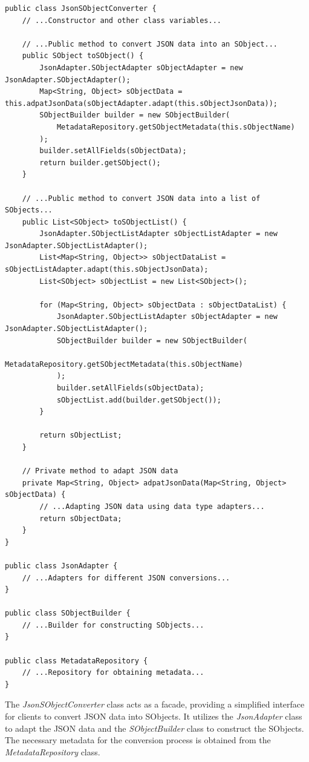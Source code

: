 \documentclass[12pt]{article}
\begin{document}
\begin{lstlisting}
public class JsonSObjectConverter {
    // ...Constructor and other class variables...
    
    // ...Public method to convert JSON data into an SObject...
    public SObject toSObject() {
        JsonAdapter.SObjectAdapter sObjectAdapter = new JsonAdapter.SObjectAdapter();
        Map<String, Object> sObjectData = this.adpatJsonData(sObjectAdapter.adapt(this.sObjectJsonData));
        SObjectBuilder builder = new SObjectBuilder(
            MetadataRepository.getSObjectMetadata(this.sObjectName)
        );
        builder.setAllFields(sObjectData);
        return builder.getSObject();
    }

    // ...Public method to convert JSON data into a list of SObjects...
    public List<SObject> toSObjectList() {
        JsonAdapter.SObjectListAdapter sObjectListAdapter = new JsonAdapter.SObjectListAdapter();
        List<Map<String, Object>> sObjectDataList = sObjectListAdapter.adapt(this.sObjectJsonData);
        List<SObject> sObjectList = new List<SObject>();

        for (Map<String, Object> sObjectData : sObjectDataList) {
            JsonAdapter.SObjectListAdapter sObjectAdapter = new JsonAdapter.SObjectListAdapter();
            SObjectBuilder builder = new SObjectBuilder(
                MetadataRepository.getSObjectMetadata(this.sObjectName)
            );
            builder.setAllFields(sObjectData);
            sObjectList.add(builder.getSObject());
        }

        return sObjectList;
    }

    // Private method to adapt JSON data
    private Map<String, Object> adpatJsonData(Map<String, Object> sObjectData) {
        // ...Adapting JSON data using data type adapters...
        return sObjectData;
    }
}

public class JsonAdapter {
    // ...Adapters for different JSON conversions...
}

public class SObjectBuilder {
    // ...Builder for constructing SObjects...
}

public class MetadataRepository {
    // ...Repository for obtaining metadata...
}    
\end{lstlisting}

The \textit{JsonSObjectConverter} class acts as a facade, providing a simplified interface for clients to convert JSON data into SObjects. It utilizes the \textit{JsonAdapter} class to adapt the JSON data and the \textit{SObjectBuilder} class to construct the SObjects. The necessary metadata for the conversion process is obtained from the \textit{MetadataRepository} class.
\end{document}
